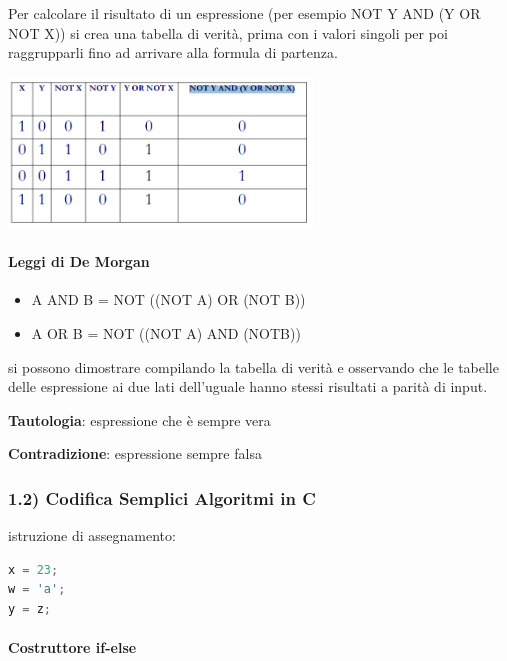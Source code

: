 \documentclass[
  paper=a4,
  oneside  ,captions=tableheading
]{scrbook}
\providecommand{\tightlist}{%
  \setlength{\itemsep}{0pt}\setlength{\parskip}{0pt}}
\begin{document}
Per calcolare il risultato di un espressione (per esempio NOT Y AND (Y
OR NOT X)) si crea una tabella di verità, prima con i valori singoli per
poi raggrupparli fino ad arrivare alla formula di partenza.
\begin{center}
\includegraphics[height=4cm]{./image/image-20201207220834575.png}
\end{center}
\hypertarget{leggi-di-de-morgan}{%
\paragraph{Leggi di De Morgan}\label{leggi-di-de-morgan}}

\begin{itemize}
\tightlist
\item
  A AND B = NOT ((NOT A) OR (NOT B))
\item
  A OR B = NOT ((NOT A) AND (NOTB))
\end{itemize}

si possono dimostrare compilando la tabella di verità e osservando che
le tabelle delle espressione ai due lati dell'uguale hanno stessi
risultati a parità di input.

\textbf{Tautologia}: espressione che è sempre vera

\textbf{Contradizione}: espressione sempre falsa

\hypertarget{codifica-semplici-algoritmi-in-c}{%
\subsubsection{1.2) Codifica Semplici Algoritmi in
C}\label{codifica-semplici-algoritmi-in-c}}

istruzione di assegnamento:

\begin{lstlisting}[language={C++}]
x = 23;
w = 'a';
y = z;
\end{lstlisting}

\hypertarget{costruttore-if-else}{%
\paragraph{Costruttore if-else}\label{costruttore-if-else}}
\end{document}
